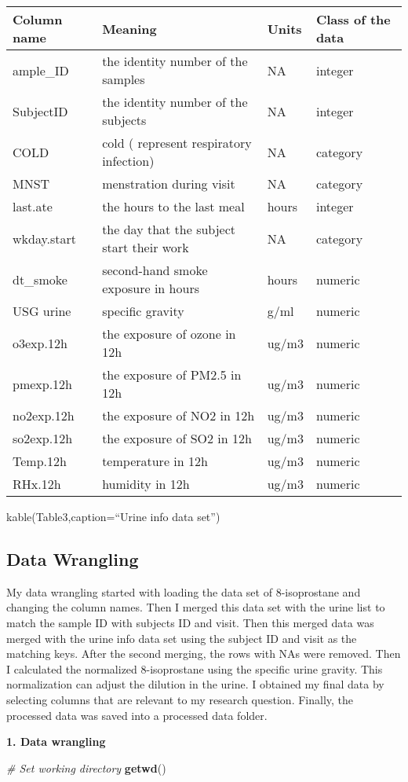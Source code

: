 \documentclass[12pt,]{article}
\newenvironment{Shaded}{\begin{snugshade}}{\end{snugshade}}
\newcommand{\CommentTok}[1]{\textcolor[rgb]{0.56,0.35,0.01}{\textit{#1}}}
\newcommand{\KeywordTok}[1]{\textcolor[rgb]{0.13,0.29,0.53}{\textbf{#1}}}
\newcommand{\NormalTok}[1]{#1}
\begin{document}
\begin{longtable}[]{@{}llll@{}}
\toprule
Column name & Meaning & Units & Class of the data\tabularnewline
\midrule
\endhead
ample\_ID & the identity number of the samples & NA &
integer\tabularnewline
SubjectID & the identity number of the subjects & NA &
integer\tabularnewline
COLD & cold ( represent respiratory infection) & NA &
category\tabularnewline
MNST & menstration during visit & NA & category\tabularnewline
last.ate & the hours to the last meal & hours & integer\tabularnewline
wkday.start & the day that the subject start their work & NA &
category\tabularnewline
dt\_smoke & second-hand smoke exposure in hours & hours &
numeric\tabularnewline
USG urine & specific gravity & g/ml & numeric\tabularnewline
o3exp.12h & the exposure of ozone in 12h & ug/m3 &
numeric\tabularnewline
pmexp.12h & the exposure of PM2.5 in 12h & ug/m3 &
numeric\tabularnewline
no2exp.12h & the exposure of NO2 in 12h & ug/m3 & numeric\tabularnewline
so2exp.12h & the exposure of SO2 in 12h & ug/m3 & numeric\tabularnewline
Temp.12h & temperature in 12h & ug/m3 & numeric\tabularnewline
RHx.12h & humidity in 12h & ug/m3 & numeric\tabularnewline
\bottomrule
\end{longtable}

kable(Table3,caption=``Urine info data set'')

\hypertarget{data-wrangling}{%
\subsection{Data Wrangling}\label{data-wrangling}}

My data wrangling started with loading the data set of 8-isoprostane and
changing the column names. Then I merged this data set with the urine
list to match the sample ID with subjects ID and visit. Then this merged
data was merged with the urine info data set using the subject ID and
visit as the matching keys. After the second merging, the rows with NAs
were removed. Then I calculated the normalized 8-isoprostane using the
specific urine gravity. This normalization can adjust the dilution in
the urine. I obtained my final data by selecting columns that are
relevant to my research question. Finally, the processed data was saved
into a processed data folder.

\newpage

\textbf{1. Data wrangling}

\begin{Shaded}
\begin{Highlighting}[]
\CommentTok{# Set working directory}
\KeywordTok{getwd}\NormalTok{()}
\end{Highlighting}
\end{Shaded}
\end{document}

